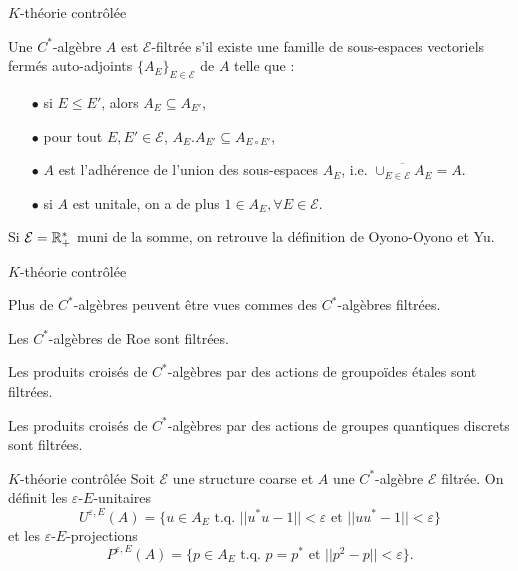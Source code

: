 \begin{frame}{$K$-théorie contrôlée}
\begin{definitionfr}
Une $C^*$-algèbre $A$ est $\mathcal E$-filtrée s'il existe une famille de sous-espaces vectoriels fermés auto-adjoints $\{A_E\}_{E\in\mathcal E}$ de $A$ telle que :
\begin{itemize}
\item[$\bullet$] si $E\leq E'$, alors $A_E\subseteq A_{E'}$,
\item[$\bullet$] pour tout $E,E'\in\mathcal E$, $A_E.A_{E'}\subseteq A_{E\circ E'}$,
\item[$\bullet$] $A$ est l'adhérence de l'union des sous-espaces $A_E$, i.e. $\overline{\cup_{E\in\mathcal E}A_E} = A$.
\item[$\bullet$] si $A$ est unitale, on a de plus $1\in A_E,\forall E\in\mathcal E$.
\end{itemize}
\end{definitionfr}

Si $\mathcal E = \mathbb R_+^*$ muni de la somme, on retrouve la définition de Oyono-Oyono et Yu. 
\end{frame}

\begin{frame}{$K$-théorie contrôlée}

Plus de $C^*$-algèbres peuvent être vues commes des $C^*$-algèbres filtrées.

\begin{exple}
Les $C^*$-algèbres de Roe sont filtrées.
\end{exple}

\begin{exple}
Les produits croisés de $C^*$-algèbres par des actions de groupoïdes étales sont filtrées.
\end{exple}

\begin{exple}
Les produits croisés de $C^*$-algèbres par des actions de groupes quantiques discrets sont filtrées.
\end{exple}

\end{frame}

\begin{frame}{$K$-théorie contrôlée}
Soit $\mathcal E$ une structure coarse et $A$ une $C^*$-algèbre $\mathcal E$ filtrée. On définit les $\varepsilon$-$E$-unitaires
\[U^{\varepsilon, E}(A)= \{u\in A_E \text{ t.q. } ||u^*u-1||<\varepsilon\text{ et }||uu^*-1||<\varepsilon \}\]
et les $\varepsilon$-$E$-projections 
\[P^{\varepsilon, E}(A)= \{p\in A_E \text{ t.q. } p=p^*\text{ et }||p^2-p||<\varepsilon \}.\]
\end{frame}

